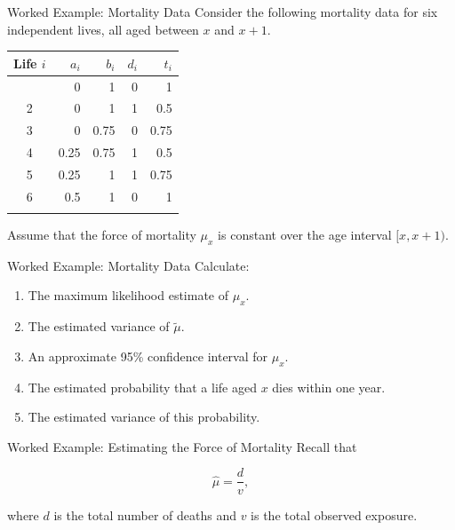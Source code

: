 \documentclass[
  ignorenonframetext,
  aspectratio=169,
]{beamer}
\newcounter{none} %
\providecommand{\tightlist}{%
  \setlength{\itemsep}{0pt}\setlength{\parskip}{0pt}}
\begin{document}
\begin{frame}{Worked Example: Mortality Data}
\protect{}\label{worked-example-mortality-data}
Consider the following mortality data for six independent lives, all
aged between \(x\) and \(x+1\).

{\def\LTcaptype{none} %
\begin{longtable}[]{@{}crrrr@{}}
\toprule\noalign{}
Life \(i\) & \(a_i\) & \(b_i\) & \(d_i\) & \(t_i\) \\
\midrule\noalign{}
\endhead
1 & 0 & 1 & 0 & 1 \\
2 & 0 & 1 & 1 & 0.5 \\
3 & 0 & 0.75 & 0 & 0.75 \\
4 & 0.25 & 0.75 & 1 & 0.5 \\
5 & 0.25 & 1 & 1 & 0.75 \\
6 & 0.5 & 1 & 0 & 1 \\
\bottomrule\noalign{}
\end{longtable}
}

Assume that the force of mortality \(\mu_x\) is constant over the age
interval \([x,x+1)\).
\end{frame}

\begin{frame}{Worked Example: Mortality Data}
\protect{}\label{worked-example-mortality-data-1}
Calculate:

\begin{enumerate}
\tightlist
\item
  The maximum likelihood estimate of \(\mu_x\).
\item
  The estimated variance of \(\tilde{\mu}\).
\item
  An approximate 95\% confidence interval for \(\mu_x\).
\item
  The estimated probability that a life aged \(x\) dies within one year.
\item
  The estimated variance of this probability.
\end{enumerate}
\end{frame}

\begin{frame}{Worked Example: Estimating the Force of Mortality}
\protect{}\label{worked-example-estimating-the-force-of-mortality}
Recall that

\[
\hat{\mu}=\frac{d}{v},
\]

where \(d\) is the total number of deaths and \(v\) is the total
observed exposure.
\end{frame}
\end{document}
